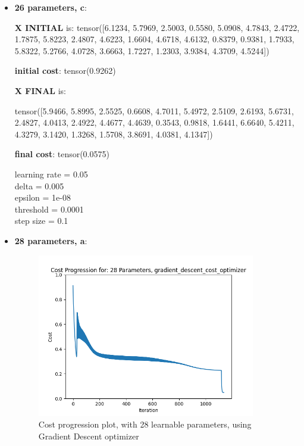 \documentclass[inscr,ack,preface]{diphdthesis}
\begin{document}
\begin{itemize}
\item \textbf{26 parameters, c}:

\textbf{X INITIAL} is:
 tensor([6.1234, 5.7969, 2.5003, 0.5580, 5.0908, 4.7843, 2.4722, 1.7875, 5.8223,
        2.4807, 4.6223, 1.6604, 4.6718, 4.6132, 0.8379, 0.9381, 1.7933, 5.8322,
        5.2766, 4.0728, 3.6663, 1.7227, 1.2303, 3.9384, 4.3709, 4.5244])
        
\textbf{initial cost}: tensor(0.9262)

\textbf{X FINAL} is:

 tensor([5.9466, 5.8995, 2.5525, 0.6608, 4.7011, 5.4972, 2.5109, 2.6193, 5.6731,
        2.4827, 4.0413, 2.4922, 4.4677, 4.4639, 0.3543, 0.9818, 1.6441, 6.6640,
        5.4211, 4.3279, 3.1420, 1.3268, 1.5708, 3.8691, 4.0381, 4.1347])

\textbf{final cost}: tensor(0.0575)

learning rate =  0.05 \\
delta =  0.005 \\
epsilon =  1e-08 \\
threshold =  0.0001\\ 
step size =  0.1 \\

\item \textbf{28 parameters,  a}: 

\begin{figure}[h]
\begin{center}
    \includegraphics[width=0.9\textwidth]{28.png}
    \caption{Cost progression plot, with 28 learnable parameters, using Gradient Descent optimizer} 
    \label{fig:enter-label}
    \end{center}
\end{figure}


\end{itemize}
\end{document}
